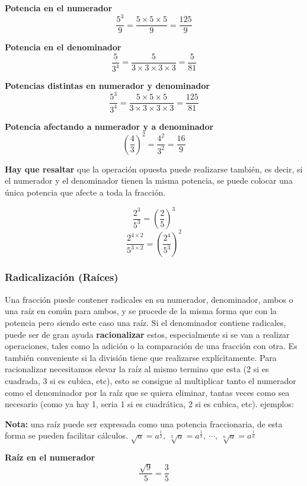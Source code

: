     \textbf{Potencia en el numerador}
    $$\frac{5^3}{9} = \frac{5\times5\times5}{9} =\frac{125}{9} $$

    \textbf{Potencia en el denominador}
    $$\frac{5}{3^4} = \frac{5}{3\times3\times3\times3} =\frac{5}{81} $$

    \textbf{Potencias distintas en numerador y denominador}
    $$\frac{5^3}{3^4} = \frac{5\times5\times5}{3\times3\times3\times3} = \frac{125}{81} $$

    \textbf{Potencia afectando a numerador y a denominador}
    $$ \left(\frac{4}{3}\right)^2 =  \frac{4^2}{3^2} = \frac{16}{9} $$


    \textbf{Hay que resaltar} que la operación opuesta puede realizarse también,
    es decir, si el numerador y el denominador tienen la misma potencia, se puede
    colocar una única potencia que afecte a toda la fracción.

    $$\frac{2^3}{5^3} = \left(\frac{2}{5}\right)^3 $$
    $$\frac{2^{4\times2}}{5^{3\times2}} =  \left(\frac{2^4}{5^3}\right)^2 $$


\subsubsection*{Radicalización (Raíces)}\label{radicalización}
    Una fracción puede contener radicales en su numerador, denominador, ambos o
    una raíz en común para  ambos, y se procede de la misma forma que con la potencia
    pero siendo este caso una raíz.
    Si el denominador contiene radicales, puede ser de gran ayuda \textbf{racionalizar}
    estos, especialmente si se van a realizar operaciones, tales como la
    adición o la comparación de una fracción con otra. Es también conveniente
    si la división tiene que realizarse explícitamente.
    Para racionalizar necesitamos elevar la raíz al mismo termino que esta (2
    si es cuadrada, 3 si es cubica, etc), esto se consigue al multiplicar tanto el
    numerador como el denominador por la raíz que se quiera eliminar, tantas veces
    como sea necesario (como ya hay 1, seria 1 si es cuadrática, 2 si es cubica, etc).
    ejemplos:

    \textbf{Nota:} una raíz puede ser expresada como una potencia fraccionaria,
    de esta forma se pueden facilitar cálculos.
    $\displaystyle \sqrt{a} = a^{\frac{1}{2}},\  \sqrt[3]{a} = a^{\frac{1}{3}},\ \cdots,\ \sqrt[n]{a}=a^{\frac{1}{n}}$


    \textbf{Raíz en el numerador}
    $$\frac{\sqrt{9}}{5} = \frac{3}{5} $$


